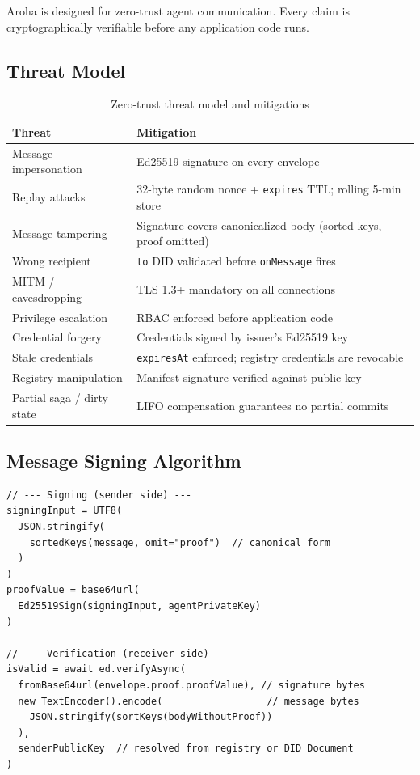 \documentclass[11pt,a4paper]{article}
\begin{document}
Aroha is designed for zero-trust agent communication. Every claim is
cryptographically verifiable before any application code runs.

\subsection{Threat Model}

\begin{table}[ht]
  \centering
  \renewcommand{\arraystretch}{1.5}
  \begin{tabularx}{\textwidth}{@{} l X @{}}
    \toprule
    \textbf{Threat} & \textbf{Mitigation} \\
    \midrule
    Message impersonation     & Ed25519 signature on every envelope \\
    Replay attacks            & 32-byte random nonce + \texttt{expires} TTL; rolling 5-min store \\
    Message tampering         & Signature covers canonicalized body (sorted keys, proof omitted) \\
    Wrong recipient           & \texttt{to} DID validated before \texttt{onMessage} fires \\
    MITM / eavesdropping      & TLS 1.3+ mandatory on all connections \\
    Privilege escalation      & RBAC enforced before application code \\
    Credential forgery        & Credentials signed by issuer's Ed25519 key \\
    Stale credentials         & \texttt{expiresAt} enforced; registry credentials are revocable \\
    Registry manipulation     & Manifest signature verified against public key \\
    Partial saga / dirty state& LIFO compensation guarantees no partial commits \\
    \bottomrule
  \end{tabularx}
  \caption{Zero-trust threat model and mitigations}
\end{table}

\subsection{Message Signing Algorithm}

\begin{lstlisting}[caption=Ed25519 signing and verification]
// --- Signing (sender side) ---
signingInput = UTF8(
  JSON.stringify(
    sortedKeys(message, omit="proof")  // canonical form
  )
)
proofValue = base64url(
  Ed25519Sign(signingInput, agentPrivateKey)
)

// --- Verification (receiver side) ---
isValid = await ed.verifyAsync(
  fromBase64url(envelope.proof.proofValue), // signature bytes
  new TextEncoder().encode(                  // message bytes
    JSON.stringify(sortKeys(bodyWithoutProof))
  ),
  senderPublicKey  // resolved from registry or DID Document
)
\end{lstlisting}
\end{document}
